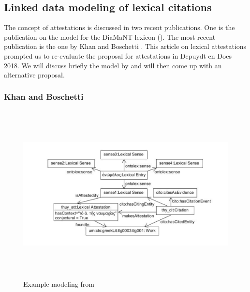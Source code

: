 \documentclass[10pt]{article}
\begin{document}
\par

\subsection{Linked data modeling of lexical citations}


The concept of attestations is discussed in two recent publications. One is the publication on the model for the DiaMaNT lexicon (\cite{DEPUYDT18.25}). The most recent publication is the one by Khan and Boschetti \cite{KhanBoschetti}.  This article on lexical attestations prompted us to re-evaluate the proposal for attestations in Depuydt en Does 2018. We will discuss briefly the model by \cite{KhanBoschetti} and will then come up with an alternative proposal.



\subsubsection*{Khan and Boschetti}




\begin{figure}[H]
	\begin{Center}
		\includegraphics[width=6.27in,height=3.6in]{./image10.png}
	\end{Center}
	\caption{Example modeling from \cite{KhanBoschetti}}
\end{figure}
\end{document}
